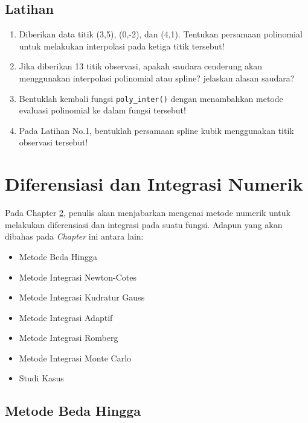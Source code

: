 \documentclass[
]{book}
\providecommand{\tightlist}{%
  \setlength{\itemsep}{0pt}\setlength{\parskip}{0pt}}
\theoremstyle{definition}
\theoremstyle{definition}
\theoremstyle{definition}
\theoremstyle{definition}
\theoremstyle{remark}
\begin{document}
\hypertarget{latihan-2}{%
\section{Latihan}\label{latihan-2}}

\begin{enumerate}
\def\labelenumi{\arabic{enumi}.}
\tightlist
\item
  Diberikan data titik (3,5), (0,-2), dan (4,1). Tentukan persamaan polinomial untuk melakukan interpolasi pada ketiga titik tersebut!
\item
  Jika diberikan 13 titik observasi, apakah saudara cenderung akan menggunakan interpolasi polinomial atau spline? jelaskan alasan saudara?
\item
  Bentuklah kembali fungsi \texttt{poly\_inter()} dengan menambahkan metode evaluasi polinomial ke dalam fungsi tersebut!
\item
  Pada Latihan No.1, bentuklah persamaan spline kubik menggunakan titik observasi tersebut!
\end{enumerate}

\hypertarget{diffinteg}{%
\chapter{Diferensiasi dan Integrasi Numerik}\label{diffinteg}}

Pada Chapter \ref{diffinteg}, penulis akan menjabarkan mengenai metode numerik untuk melakukan diferensiasi dan integrasi pada suatu fungsi. Adapun yang akan dibahas pada \emph{Chapter} ini antara lain:

\begin{itemize}
\tightlist
\item
  Metode Beda Hingga
\item
  Metode Integrasi Newton-Cotes
\item
  Metode Integrasi Kudratur Gauss
\item
  Metode Integrasi Adaptif
\item
  Metode Integrasi Romberg
\item
  Metode Integrasi Monte Carlo
\item
  Studi Kasus
\end{itemize}

\hypertarget{finitediff}{%
\section{Metode Beda Hingga}\label{finitediff}}
\end{document}
